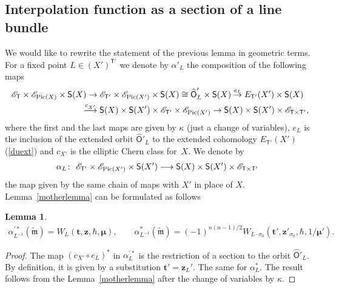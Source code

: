 \documentclass[pdftex]{sigma}
\newcommand{\bT}{\mathsf{T}}
\newcommand{\Or}{\textsf{O}}
\newcommand{\cE}{\mathscr{E}}
\def\ttt{{\boldsymbol t}}
\def\zz{{\boldsymbol z}}
\def\mub{{\boldsymbol\mu}}
\numberwithin{equation}{section}
\newtheorem{Lemma}[Theorem]{Lemma}
\begin{document}
\subsection{Interpolation function as a section of a line bundle}
We would like to rewrite the statement of the previous lemma in geometric terms.
For a fixed point $L \in (X')^{\bT'}$ we denote by $\alpha'_{L}$ the composition of the following maps
\begin{gather*}
\cE_{\bT}\times \cE_{{\rm Pic}(X)}\times \textsf{S}(X) \rightarrow \cE_{\bT'}\times \cE_{{\rm Pic}(X')}\times \textsf{S}(X)\cong \widehat{\Or}'_{L} \times \textsf{S}(X)
\stackrel{e_{L}}{\rightarrow} E_{\bT'}(X')\times \textsf{S}(X)\\
\hphantom{\cE_{\bT}\times \cE_{{\rm Pic}(X)}\times \textsf{S}(X)}{}
 \stackrel{c_{X'}}{\longrightarrow} \textsf{S}(X)\times \textsf{S}(X') \times \cE_{\bT'}\times \cE_{{\rm Pic}(X')}\rightarrow \textsf{S}(X)\times \textsf{S}(X') \times \cE_{\bT\times \bT'},
\end{gather*}
where the first and the last maps are given by $\kappa$ (just a change of variables), $e_{L}$ is the inclusion of the extended orbit $\widehat{\Or}'_{L}$ to the extended cohomology $E_{\bT'}(X')$ (\ref{duext}) and $c_{X'}$ is the elliptic Chern class for~$X$. We denote by
\begin{gather*}
\alpha_{L}\colon \ \cE_{\bT'}\times \cE_{{\rm Pic}(X')}\times \textsf{S}(X')\longrightarrow \textsf{S}(X)\times \textsf{S}(X') \times \cE_{\bT\times \bT'}
\end{gather*}
the map given by the same chain of maps with $X'$ in place of $X$. Lemma~\ref{motherlemma} can be formulated as follows
\begin{Lemma} \label{allem}
 \begin{gather*}
 \alpha^{'*}_{L^{-1}} (\tilde{\mathfrak{m}})= W_{L}(\ttt,\zz,\hbar,\mub), \qquad \alpha^{*}_{L^{-1}} (\tilde{\mathfrak{m}})=(-1)^{n(n-1)/2} W_{L\cdot\sigma_0}(\ttt',\zz'_{\sigma_0},\hbar,1/\mub').
 \end{gather*}
\end{Lemma}
\begin{proof} The map $(c_{X'} \circ e_L)^*$ in $\alpha^{'*}_{L}$ is the restriction of a section to the orbit $\widehat{\Or}'_{L}$. By definition, it is given by a substitution $\ttt'=\zz_{L}'$. The same for $\alpha^{*}_{L}$. The result follows from the Lemma~\ref{motherlemma} after the change of variables by $\kappa$.
\end{proof}
\end{document}
